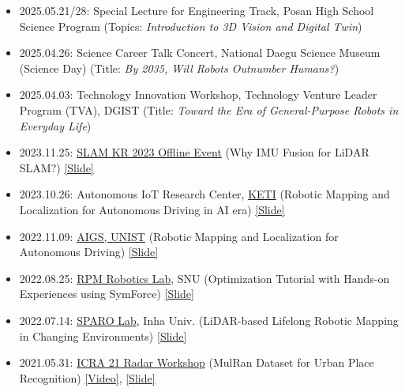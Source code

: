 \documentclass{cv} %
\begin{document}
\begin{itemize}[label=$\cdot$]
    \item 2025.05.21/28: Special Lecture for Engineering Track, Posan High School Science Program
    \hfill (Topics: \textit{Introduction to 3D Vision and Digital Twin})

    \item 2025.04.26: Science Career Talk Concert, National Daegu Science Museum (Science Day)
    \hfill (Title: \textit{By 2035, Will Robots Outnumber Humans?})

    \item 2025.04.03: Technology Innovation Workshop, Technology Venture Leader Program (TVA), DGIST
    \hfill (Title: \textit{Toward the Era of General-Purpose Robots in Everyday Life})

    \item 2023.11.25: \href{https://drive.google.com/file/d/1h5sMgkyGGA8X2gxJUEzWCSwX9RlujNpe/view?usp=sharing}{SLAM KR 2023 Offline Event} (Why IMU Fusion for LiDAR SLAM?) \href{https://bit.ly/20231125_slamkr_giseopkim}{[Slide]}

    \item 2023.10.26: Autonomous IoT Research Center, \href{https://www.keti.re.kr/eng/main/main.php}{KETI} (Robotic Mapping and Localization for Autonomous Driving in AI era) \href{https://bit.ly/408J7XJ}{[Slide]}

    \item 2022.11.09: \href{https://ib.unist.ac.kr/robust-slam-simultaneous-localization-and-mapping-for-large-scale-urban-mapping-and-autonomous-driving/}{AIGS, UNIST} (Robotic Mapping and Localization for Autonomous Driving) \href{https://docs.google.com/presentation/d/1RLrrxGzzGWEgUQMvdWH0wNfsyn6ML2Hjw88PmgdrvlQ/edit?usp=sharing}{[Slide]}

    \item 2022.08.25: \href{https://rpm.snu.ac.kr/}{RPM Robotics Lab}, SNU (Optimization Tutorial with Hands-on Experiences using SymForce) \href{https://docs.google.com/presentation/d/1Z1FjnphgP60jTIa6da8vwhaAEzULefLrPQsJ4yBHAJA/edit?usp=sharing}{[Slide]}

    \item 2022.07.14: \href{https://sites.google.com/view/sparo/홈}{SPARO Lab}, Inha Univ. (LiDAR-based Lifelong Robotic Mapping in Changing Environments) \href{https://docs.google.com/presentation/d/1Muld60rT7KY_FaN4hyRaPHR2FsPkLV8z7fz7rYQzIv4/edit?usp=sharing}{[Slide]}

    \item 2021.05.31: \href{https://sites.google.com/view/radar-robotics/home}{ICRA 21 Radar Workshop} (MulRan Dataset for Urban Place Recognition) \href{https://www.youtube.com/watch?v=jFvKW9Kj8Ts}{[Video]}, \href{https://www.dropbox.com/s/dknylah6b7rizr8/20210531\%20icra\%20ws\%20mulran\%20v3.pptx?dl=0}{[Slide]}


\end{itemize}
\end{document}
